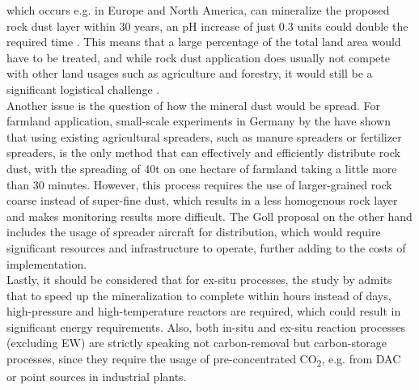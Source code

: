 which occurs e.g. in Europe and North America, can mineralize the proposed rock dust layer within 30 years, an pH increase of just 0.3 units could double the required time \parencite{Schuiling2006EnhancedCo2}. This means that a large percentage of the total land area would have to be treated, and while rock dust application does usually not compete with other land usages such as agriculture and forestry, it would still be a significant logistical challenge \parencite{Dipple2021TheSystems}.\\Another issue is the question of how the mineral dust would be spread. For farmland application, small-scale experiments in Germany by the \textcite{CarbonDrawdownInitiative2022HowExperiments} have shown that using existing agricultural spreaders, such as manure spreaders or fertilizer spreaders, is the only method that can effectively and efficiently distribute rock dust, with the spreading of 40t on one hectare of farmland taking a little more than 30 minutes. However, this process requires the use of larger-grained rock coarse instead of super-fine dust, which results in a less homogenous rock layer and makes monitoring results more difficult. The Goll proposal on the other hand includes the usage of spreader aircraft for distribution, which would require significant resources and infrastructure to operate, further adding to the costs of implementation.\\Lastly, it should be considered that for ex-situ processes, the study by \textcite{Lackner1997ProgressSubstrates} admits that to speed up the mineralization to complete within hours instead of days, high-pressure and high-temperature reactors are required, which could result in significant energy requirements. Also, both in-situ and ex-situ reaction processes (excluding EW) are strictly speaking not carbon-removal but carbon-storage processes, since they require the usage of pre-concentrated CO\textsubscript{2}, e.g. from DAC or point sources in industrial plants.
